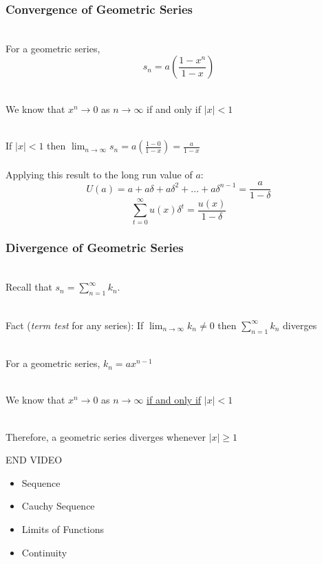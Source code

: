 \documentclass{beamer}
\numberwithin{equation}{section}
\begin{document}
\begin{frame}
\frametitle{Convergence of Geometric Series}

\ \\For a geometric series, $$s_n=a\left(\frac{1-x^n}{1-x}\right)$$ \pause

\ \\We know that $x^n\rightarrow 0$ as $n\rightarrow\infty$ if and only if $|x|<1$ \pause

\ \\If $|x|<1$ then $\lim_{n\rightarrow\infty}s_n = a\left({\frac{1-0}{1-x}}\right) = {\frac{a}{1-x}}$\pause\\

\ \\ Applying this result to the long run value of $a$: 
$$U(a)=a+a\delta+a\delta^2+...+a\delta^{n-1} =\frac{a}{1-\delta}$$
$$\sum_{t=0}^\infty  u(x)\delta^t = {\frac{u(x)}{1 - \delta}}$$

\end{frame}



\begin{frame}
\frametitle{Divergence of Geometric Series}

\ \\Recall that $s_{n} = \sum_{n = 1}^{\infty} k_{n}$. \pause

\ \\Fact (\textit{term test} for any series): If $\lim_{n\rightarrow \infty} k_n\not=0$ then $\sum_{n=1}^\infty k_n$ diverges \pause

\ \\For a geometric series, $k_n=ax^{n-1}$ \pause

\ \\We know that $x^n\rightarrow 0$ as $n\rightarrow\infty$ \underline{if and only if} $|x|<1$ \pause

\ \\Therefore, a geometric series diverges whenever $|x|\geq 1$

\end{frame}

\begin{frame}
END VIDEO

\end{frame}





\begin{frame}

\begin{itemize}
\item \textcolor{mygray}{Sequence}
 
\item \textcolor{mygray}{Cauchy Sequence}
\item \textcolor{myblack}{Limits of Functions}
\item \textcolor{mygray}{Continuity}
\end{itemize}

\end{frame}
\end{document}
